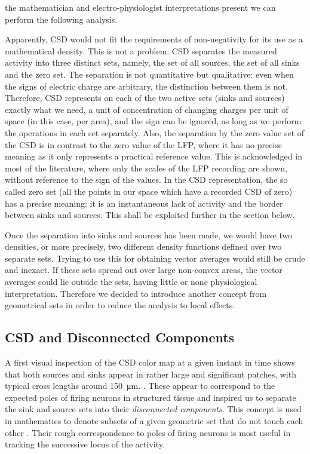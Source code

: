 \documentclass[utf8]{frontiersSCNS}
\newcommand{\mum}[1]{\SI{#1}{\micro\metre}}
\begin{document}
the mathematician and electro-physiologist interpretations present we can
perform the following analysis.

Apparently, CSD would not fit the requirements of non-negativity for its use as a mathematical density. This is not a problem.  CSD separates the measured activity into three distinct sets, namely, the set of all sources, the set of all sinks and the zero set. The separation is not quantitative but qualitative: even when the signs of electric charge are arbitrary, the distinction between them is not. Therefore, CSD represents on each of the two active sets (sinks and sources) exactly what we need, a unit of concentration of changing charges per unit of space (in this case, per area), and the sign can be ignored, as long as we perform the operations in each set separately. Also, the separation by the zero value set of the CSD is in contrast to the zero value of the LFP, where it has no precise meaning as it only represents a practical reference value. This is acknowledged in most of the literature, where only the scales of the LFP recording are shown, without reference to the sign of the values. In the CSD representation,  the so called zero set (all the points in our space which have a recorded CSD of zero)  has a precise meaning: it is an instantaneous lack of activity and the border between sinks and sources. This shall be exploited further in the section below.

Once the separation into sinks and sources has been made, we would have two densities, or more precisely, two different density functions defined over two separate sets. Trying to use this for obtaining vector averages would still be crude and inexact. If these sets spread out over large non-convex areas, the vector averages could lie outside the sets, having little or none physiological interpretation. Therefore we decided to introduce another concept from geometrical sets in order to reduce the analysis to local effects.


\subsection{CSD and Disconnected Components}

A first visual inspection of the CSD color map at a given instant in time shows that both sources and sinks appear in rather large and significant patches, with typical
cross lengths around \mum{150}. .
These appear to correspond to the expected poles of firing neurons in structured tissue \citep{Buzsaki2012} and inspired us to separate the sink and source  sets into their \emph{disconnected components}. This concept is used in mathematics to denote subsets of a given geometric set that do not touch each other  \citep{Halmos}. Their rough correspondence to poles of firing neurons is most useful in tracking the successive locus of the activity.
\end{document}
